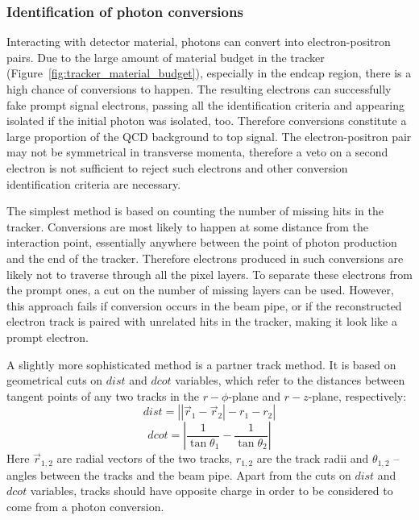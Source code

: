 \subsubsection{Identification of photon conversions}
\label{sss:photon_conversions}
Interacting with detector material, photons can convert into electron-positron pairs. Due to the large amount of
material budget in the tracker (Figure~\ref{fig:tracker_material_budget}), especially in the endcap region, there is a
high chance of conversions to happen. The resulting electrons can successfully fake prompt signal electrons, passing all
the identification criteria and appearing isolated if the initial photon was isolated, too. Therefore conversions
constitute a large proportion of the QCD background to top signal. The electron-positron pair may not be symmetrical in
transverse momenta, therefore a veto on a second electron is not sufficient to reject such electrons and other
conversion identification criteria are necessary.

The simplest method is based on counting the number of missing hits in the tracker. Conversions are most likely to
happen at some distance from the interaction point, essentially anywhere between the point of photon production and the
end of the tracker. Therefore electrons produced in such conversions are likely not to traverse through all the pixel
layers. To separate these electrons from the prompt ones, a cut on the number of missing layers can be used. However,
this approach fails if conversion occurs in the beam pipe, or if the reconstructed electron track is paired with
unrelated hits in the tracker, making it look like a prompt electron.

A slightly more sophisticated method is a partner track method. It is based on geometrical cuts on $dist$ and $dcot$
variables, which refer to the distances between tangent points of any two tracks in the $r-\phi$-plane and $r-z$-plane,
respectively:
\begin{equation}
  dist = \left|\left|\vec{r}_1 - \vec{r}_2 \right|- r_1 - r_2\right|
\end{equation}
\begin{equation}
  dcot = \left|\frac{1}{\tan\theta_1} -\frac{1}{\tan\theta_2}\right|
\end{equation}
Here $\vec{r}_{1,2}$ are radial vectors of the two tracks, $r_{1,2}$ are the track radii and $\theta_{1,2}$ -- angles
between the tracks and the beam pipe. Apart from the cuts on $dist$ and $dcot$ variables, tracks should have opposite
charge in order to be considered to come from a photon conversion.

